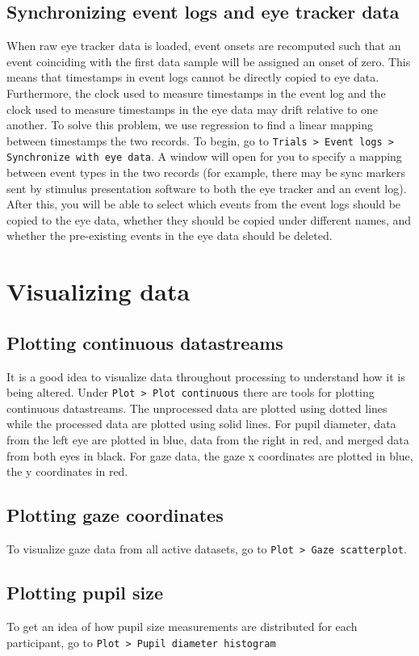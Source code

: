 \documentclass{article}
\begin{document}
\subsection{Synchronizing event logs and eye tracker data}
When raw eye tracker data is loaded, event onsets are recomputed such that an event coinciding with the first data sample will be assigned an onset of zero. This means that timestamps in event logs cannot be directly copied to eye data. Furthermore, the clock used to measure timestamps in the event log and the clock used to measure timestamps in the eye data may drift relative to one another. To solve this problem, we use regression to find a linear mapping between timestamps the two records. To begin, go to \texttt{Trials > Event logs > Synchronize with eye data}. A window will open for you to specify a mapping between event types in the two records (for example, there may be sync markers sent by stimulus presentation software to both the eye tracker and an event log). After this, you will be able to select which events from the event logs should be copied to the eye data, whether they should be copied under different names, and whether the pre-existing events in the eye data should be deleted.

\section{Visualizing data}
\subsection{Plotting continuous datastreams}
It is a good idea to visualize data throughout processing to understand how it is being altered. Under \texttt{Plot > Plot continuous} there are tools for plotting continuous datastreams. The unprocessed data are plotted using dotted lines while the processed data are plotted using solid lines. For pupil diameter, data from the left eye are plotted in blue, data from the right in red, and merged data from both eyes in black. For gaze data, the gaze x coordinates are plotted in blue, the y coordinates in red.

\subsection{Plotting gaze coordinates}
To visualize gaze data from all active datasets, go to \texttt{Plot > Gaze scatterplot}.

\subsection{Plotting pupil size}
To get an idea of how pupil size measurements are distributed for each participant, go to \texttt{Plot > Pupil diameter histogram}
\end{document}
